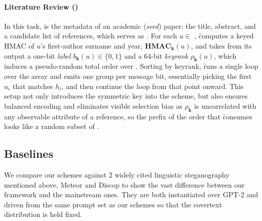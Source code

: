 

\paragraph{Literature Review (\lr)}
In this task, \inp is the metadata of an academic (\emph{seed}) paper: the title, abstract, and a candidate list of references, which serves as \units. 
For each $u \in$ \units, \f computes a keyed HMAC of $u$'s first-author surname and year, $\mathbf{HMAC_k}(u)$, and takes from its output a one-bit \emph{label} $b_\mathbf{k}(u) \in \{0,1\}$ and a 64-bit \emph{keyrank} $\rho_\mathbf{k}(u)$, which induces a pseudo-random total order over \units.
Sorting \units by keyrank, \f runs a single loop over the array and emits one group per message bit, essentially picking the first $u_i$ that matches $h_i$, and then continue the loop from that point onward.
This setup not only introduces the symmetric key into the scheme, but also ensures balanced encoding and eliminates visible selection bias as $\rho_\mathbf{k}$ is uncorrelated with any observable attribute of a reference, so the prefix of the order that \f consumes looks like a random subset of \units.

\subsection{Baselines}
\label{subsec:baselines}
We compare our schemes against 2 widely cited linguistic steganography mentioned above, Meteor \citep{kaptchuk2021meteor} and Discop \citep{ding2023discop} to show the vast difference between our framework and the mainstream ones.
They are both instantiated over GPT-2 \citep{radford2019language} and driven from the same prompt set as our schemes so that the covertext distribution is held fixed.

